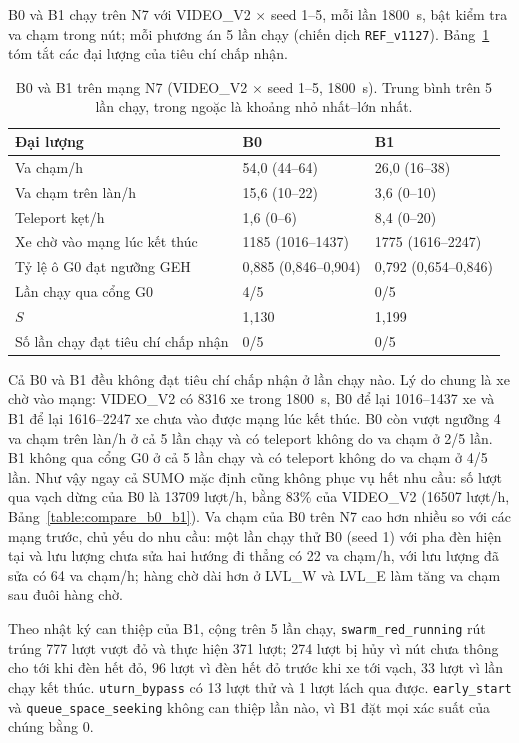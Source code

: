 \documentclass[../main.tex]{subfiles}
\begin{document}
B0 và B1 chạy trên N7 với VIDEO\_V2 $\times$ seed 1--5, mỗi lần 1800~s, bật kiểm tra va chạm trong nút; mỗi phương án 5 lần chạy (chiến dịch \texttt{REF\_v1127}). Bảng~\ref{table:4.ref_v1126} tóm tắt các đại lượng của tiêu chí chấp nhận.

\begin{table}[!htbp]
\centering
\small
\caption{B0 và B1 trên mạng N7 (VIDEO\_V2 $\times$ seed 1--5, 1800~s). Trung bình trên 5 lần chạy, trong ngoặc là khoảng nhỏ nhất--lớn nhất.} \label{table:4.ref_v1126}
\begin{tabular}{|>{\raggedright\arraybackslash}p{5.6cm}|p{3.6cm}|p{3.6cm}|}
\hline
\textbf{Đại lượng} & \textbf{B0} & \textbf{B1} \\ \hline
Va chạm/h & 54,0 (44--64) & 26,0 (16--38) \\ \hline
Va chạm trên làn/h & 15,6 (10--22) & 3,6 (0--10) \\ \hline
Teleport kẹt/h & 1,6 (0--6) & 8,4 (0--20) \\ \hline
Xe chờ vào mạng lúc kết thúc & 1185 (1016--1437) & 1775 (1616--2247) \\ \hline
Tỷ lệ ô G0 đạt ngưỡng GEH & 0,885 (0,846--0,904) & 0,792 (0,654--0,846) \\ \hline
Lần chạy qua cổng G0 & 4/5 & 0/5 \\ \hline
$S$ & 1,130 & 1,199 \\ \hline
Số lần chạy đạt tiêu chí chấp nhận & 0/5 & 0/5 \\ \hline
\end{tabular}
\end{table}

Cả B0 và B1 đều không đạt tiêu chí chấp nhận ở lần chạy nào. Lý do chung là xe chờ vào mạng: VIDEO\_V2 có 8316 xe trong 1800~s, B0 để lại 1016--1437 xe và B1 để lại 1616--2247 xe chưa vào được mạng lúc kết thúc. B0 còn vượt ngưỡng 4 va chạm trên làn/h ở cả 5 lần chạy và có teleport không do va chạm ở 2/5 lần. B1 không qua cổng G0 ở cả 5 lần chạy và có teleport không do va chạm ở 4/5 lần. Như vậy ngay cả SUMO mặc định cũng không phục vụ hết nhu cầu: số lượt qua vạch dừng của B0 là 13709 lượt/h, bằng 83\% của VIDEO\_V2 (16507 lượt/h, Bảng~\ref{table:compare_b0_b1}). Va chạm của B0 trên N7 cao hơn nhiều so với các mạng trước, chủ yếu do nhu cầu: một lần chạy thử B0 (seed 1) với pha đèn hiện tại và lưu lượng chưa sửa hai hướng đi thẳng có 22 va chạm/h, với lưu lượng đã sửa có 64 va chạm/h; hàng chờ dài hơn ở LVL\_W và LVL\_E làm tăng va chạm sau đuôi hàng chờ.

Theo nhật ký can thiệp của B1, cộng trên 5 lần chạy, \texttt{swarm\_red\_running} rút trúng 777 lượt vượt đỏ và thực hiện 371 lượt; 274 lượt bị hủy vì nút chưa thông cho tới khi đèn hết đỏ, 96 lượt vì đèn hết đỏ trước khi xe tới vạch, 33 lượt vì lần chạy kết thúc. \texttt{uturn\_bypass} có 13 lượt thử và 1 lượt lách qua được. \texttt{early\_start} và \texttt{queue\_space\_seeking} không can thiệp lần nào, vì B1 đặt mọi xác suất của chúng bằng 0.
\end{document}
